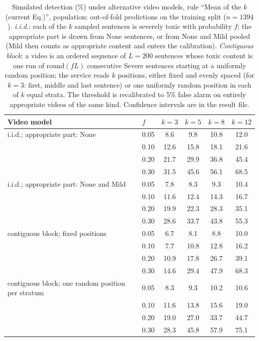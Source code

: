 \begin{table}[!t]
\centering
\caption{Simulated detection (\%) under alternative video models, rule ``Mean of the $k$ (current Eq.)'', population: out-of-fold predictions on the training split ($n = 1394$). \emph{i.i.d.}: each of the $k$ sampled sentences is severely toxic with probability $f$; the appropriate part is drawn from None sentences, or from None and Mild pooled (Mild then counts as appropriate content and enters the calibration). \emph{Contiguous block}: a video is an ordered sequence of $L = 200$ sentences whose toxic content is one run of $\mathrm{round}(fL)$ consecutive Severe sentences starting at a uniformly random position; the service reads $k$ positions, either fixed and evenly spaced (for $k = 3$: first, middle and last sentence) or one uniformly random position in each of $k$ equal strata. The threshold is recalibrated to 5\% false alarm on entirely appropriate videos of the same kind. Confidence intervals are in the result file.}
\label{tab:simulacao-variantes}
\begin{tabular}{llcccc}
\toprule
Video model & $f$ & $k=3$ & $k=5$ & $k=8$ & $k=12$ \\
\midrule
i.i.d.; appropriate part: None & 0.05 & 8.6 & 9.8 & 10.8 & 12.0 \\
 & 0.10 & 12.6 & 15.8 & 18.1 & 21.6 \\
 & 0.20 & 21.7 & 29.9 & 36.8 & 45.4 \\
 & 0.30 & 31.5 & 45.6 & 56.1 & 68.5 \\
\midrule
i.i.d.; appropriate part: None and Mild & 0.05 & 7.8 & 8.3 & 9.3 & 10.4 \\
 & 0.10 & 11.6 & 12.4 & 14.3 & 16.7 \\
 & 0.20 & 19.9 & 22.3 & 28.3 & 35.1 \\
 & 0.30 & 28.6 & 33.7 & 43.8 & 55.3 \\
\midrule
contiguous block; fixed positions & 0.05 & 6.7 & 8.1 & 8.8 & 10.0 \\
 & 0.10 & 7.7 & 10.8 & 12.8 & 16.2 \\
 & 0.20 & 10.9 & 17.8 & 26.7 & 39.1 \\
 & 0.30 & 14.6 & 29.4 & 47.9 & 68.3 \\
\midrule
contiguous block; one random position per stratum & 0.05 & 8.3 & 9.3 & 10.2 & 10.6 \\
 & 0.10 & 11.6 & 13.8 & 15.6 & 19.0 \\
 & 0.20 & 19.0 & 27.0 & 33.7 & 44.7 \\
 & 0.30 & 28.3 & 45.8 & 57.9 & 75.1 \\
\bottomrule
\end{tabular}
\end{table}
